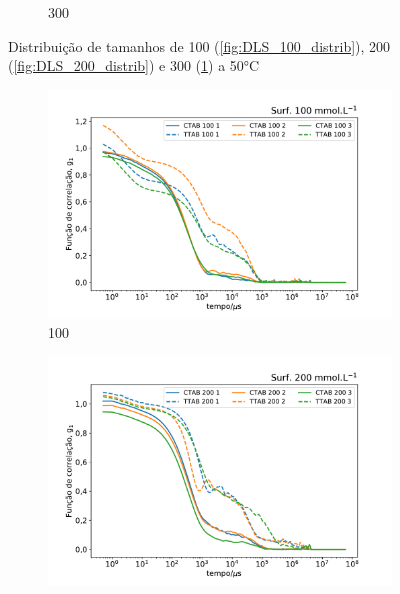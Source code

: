 \begin{figure}[h]
\begin{subfigure}{0.3\textwidth}
		\caption{300\mM}
		\label{fig:DLS_300_distrib}
	\end{subfigure}
	\caption{Distribuição de tamanhos de \CTTAB{} 100 (\ref{fig:DLS_100_distrib}), 200 (\ref{fig:DLS_200_distrib}) e 300 (\ref{fig:DLS_300_distrib}) \mM{} a 50°C}
	\label{fig:DLS_distrib_conc}
\end{figure}

\begin{figure}[h]
	\begin{subfigure}{0.3\textwidth}
		\centering
		\includegraphics[width=\textwidth]{imagens/dls/100_CC}
		\caption{100\mM}
		\label{fig:DLS_100_CC}
	\end{subfigure} %
	\begin{subfigure}{0.3\textwidth}
		\centering
		\includegraphics[width=\textwidth]{imagens/dls/200_CC}

\end{subfigure}
\end{figure}
